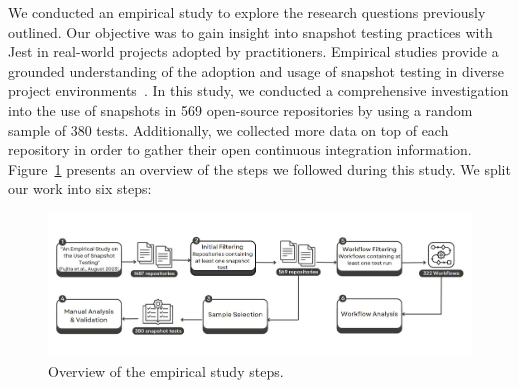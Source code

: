 \documentclass[
	msc, %
	english %
]{../ppgccufmg}
\begin{document}
        We conducted an empirical study to explore the research questions previously outlined. Our objective was to gain insight into snapshot testing practices with Jest in real-world projects adopted by practitioners. Empirical studies provide a grounded understanding of the adoption and usage of snapshot testing in diverse project environments~\cite{fujita2023empirical}. In this study, we conducted a comprehensive investigation into the use of snapshots in 569 open-source repositories by using a random sample of 380 tests. Additionally, we collected more data on top of each repository in order to gather their open continuous integration information. Figure~\ref{fig:empirical-study-design} presents an overview of the steps we followed during this study. We split our work into six steps:

        \begin{figure}[h]
            \centering
            \label{fig:empirical-study-design}
            \includegraphics[width=\textwidth]{exemplo/img/study_design_steps.png}
            \caption{Overview of the empirical study steps.}
        \end{figure}
\end{document}
